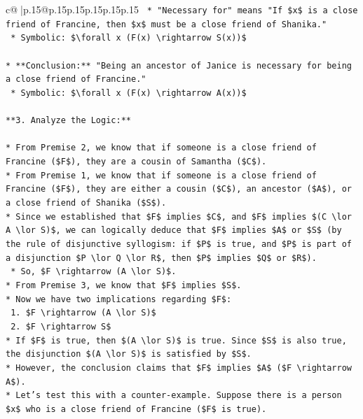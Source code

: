 \documentclass{article}
\begin{document}
{\begin{supertabular}{c@{$\;$}|p{.15\linewidth}@{}p{.15\linewidth}p{.15\linewidth}p{.15\linewidth}p{.15\linewidth}p{.15\linewidth}}
{{{\texttt{    *   "Necessary for" means "If \$x\$ is a close friend of Francine, then \$x\$ must be a close friend of Shanika."} \\
\texttt{    *   Symbolic: \$\textbackslash{}forall x (F(x) \textbackslash{}rightarrow S(x))\$} \\
\\ 
\texttt{*   **Conclusion:** "Being an ancestor of Janice is necessary for being a close friend of Francine."} \\
\texttt{    *   Symbolic: \$\textbackslash{}forall x (F(x) \textbackslash{}rightarrow A(x))\$} \\
\\ 
\texttt{**3. Analyze the Logic:**} \\
\\ 
\texttt{*   From Premise 2, we know that if someone is a close friend of Francine (\$F\$), they are a cousin of Samantha (\$C\$).} \\
\texttt{*   From Premise 1, we know that if someone is a close friend of Francine (\$F\$), they are either a cousin (\$C\$), an ancestor (\$A\$), or a close friend of Shanika (\$S\$).} \\
\texttt{*   Since we established that \$F\$ implies \$C\$, and \$F\$ implies \$(C \textbackslash{}lor A \textbackslash{}lor S)\$, we can logically deduce that \$F\$ implies \$A\$ or \$S\$ (by the rule of disjunctive syllogism: if \$P\$ is true, and \$P\$ is part of a disjunction \$P \textbackslash{}lor Q \textbackslash{}lor R\$, then \$P\$ implies \$Q\$ or \$R\$).} \\
\texttt{    *   So, \$F \textbackslash{}rightarrow (A \textbackslash{}lor S)\$.} \\
\texttt{*   From Premise 3, we know that \$F\$ implies \$S\$.} \\
\texttt{*   Now we have two implications regarding \$F\$:} \\
\texttt{    1.  \$F \textbackslash{}rightarrow (A \textbackslash{}lor S)\$} \\
\texttt{    2.  \$F \textbackslash{}rightarrow S\$} \\
\texttt{*   If \$F\$ is true, then \$(A \textbackslash{}lor S)\$ is true. Since \$S\$ is also true, the disjunction \$(A \textbackslash{}lor S)\$ is satisfied by \$S\$.} \\
\texttt{*   However, the conclusion claims that \$F\$ implies \$A\$ (\$F \textbackslash{}rightarrow A\$).} \\
\texttt{*   Let's test this with a counter{-}example. Suppose there is a person \$x\$ who is a close friend of Francine (\$F\$ is true).} \\
}}}
\end{supertabular}}
\end{document}
